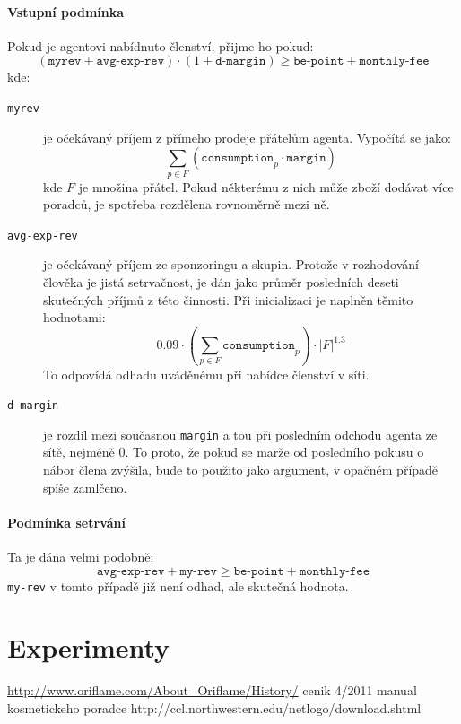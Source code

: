 \documentclass[a4wide,12pt]{report}
\begin{document}
\subsubsection{Vstupní podmínka}
Pokud je agentovi nabídnuto členství, přijme ho pokud:
$$(\texttt{myrev} + \texttt{avg-exp-rev}) \cdot (1+\texttt{d-margin}) \geq \texttt{be-point} + \texttt{monthly-fee}$$
kde:
\begin{description}
\item[\texttt{myrev}] je očekávaný příjem z přímeho prodeje přátelům agenta. Vypočítá se jako: $$\sum_{p\in F}(\texttt{consumption}_p\cdot\texttt{margin})$$
kde $F$ je množina přátel. Pokud některému z nich může zboží dodávat více poradců, je spotřeba rozdělena rovnoměrně mezi ně.
\item[\texttt{avg-exp-rev}] je očekávaný příjem ze sponzoringu a skupin. Protože v rozhodování člověka je jistá setrvačnost, je dán jako průměr posledních deseti skutečných příjmů z této činnosti. Při inicializaci je naplněn těmito hodnotami:
\[ 0.09\cdot (\sum_{p\in F}\texttt{consumption}_p)\cdot |F|^{1.3} \]
To odpovídá odhadu uváděnému při nabídce členství v síti.
\item[\texttt{d-margin}] je rozdíl mezi současnou \texttt{margin} a tou při posledním odchodu agenta ze sítě, nejméně 0. To proto, že pokud se marže od posledního pokusu o nábor člena zvýšila, bude to použito jako argument, v opačném případě spíše zamlčeno.
\end{description}
\subsubsection{Podmínka setrvání}
Ta je dána velmi podobně:
\[ \texttt{avg-exp-rev} + \texttt{my-rev} \geq \texttt{be-point} + \texttt{monthly-fee} \]
\texttt{my-rev} v tomto případě již není odhad, ale skutečná hodnota.
\chapter{Experimenty}
\begin{thebibliography}{9}


\end{thebibliography}
\url{http://www.oriflame.com/About_Oriflame/History/}
cenik 4/2011
manual kosmetickeho poradce
http://ccl.northwestern.edu/netlogo/download.shtml
\end{document}
